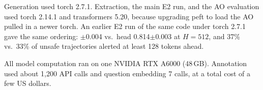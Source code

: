 Generation used torch 2.7.1. Extraction, the main E2 run, and the AO evaluation used torch 2.14.1 and transformers 5.20, because upgrading peft to load the AO pulled in a newer torch. An earlier E2 run of the same code under torch 2.7.1 gave the same ordering: $\pm$0.004 vs.\ \forecast head 0.814$\pm$0.003 \auroc at $H{=}512$, and 37\% vs.\ 33\% of unsafe trajectories alerted at least 128 tokens ahead.

All model computation ran on one NVIDIA RTX A6000 (48\,GB). Annotation used about 1,200 API calls and question embedding 7 calls, at a total cost of a few US dollars.

